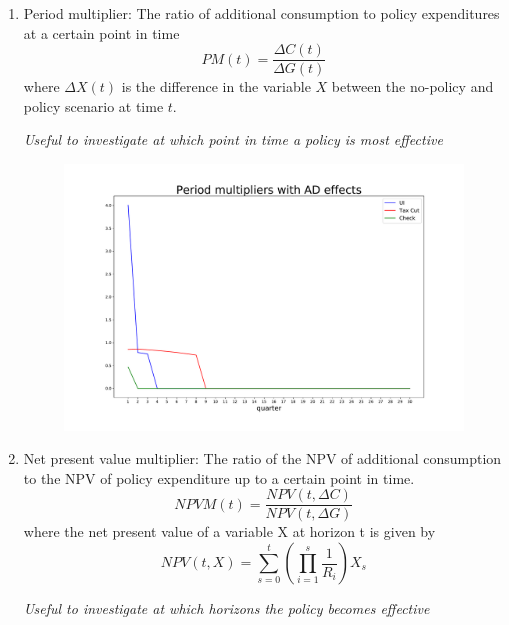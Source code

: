 \documentclass[]{article}
\begin{document}
\begin{enumerate}
	\item Period multiplier: The ratio of additional consumption to policy expenditures at a certain point in time
	\begin{equation}
	PM(t) = \frac{\Delta C (t) }{\Delta G(t)}
	\end{equation}	
	where $\Delta X(t)$ is the difference in the variable $X$ between the no-policy and policy scenario at time $t$.
	
	\textit{Useful to investigate at which point in time a policy is most effective}
		
	\begin{figure}[h!]
		\centering
		\includegraphics[width=\linewidth]{../FullRun_June7th/P_multipliers}
		\caption{}
		\label{fig:pmultipliers}
	\end{figure}
	
	\item Net present value multiplier: The ratio of the NPV of additional consumption to the NPV of policy expenditure up to a certain point in time.
	\begin{equation}
	NPVM(t) = \frac{NPV(t,\Delta C)}{NPV (t,\Delta G)}
	\end{equation}	
	where the net present value of a variable X at horizon t is given by
	\begin{equation}
	NPV(t,X) = \sum_{s=0}^{t} \left( \prod_{i=1}^{s} \frac{1}{R_i} \right) X_s
	\end{equation}
	
	\textit{Useful to investigate at which horizons the policy becomes effective}
	

\end{enumerate}
\end{document}
